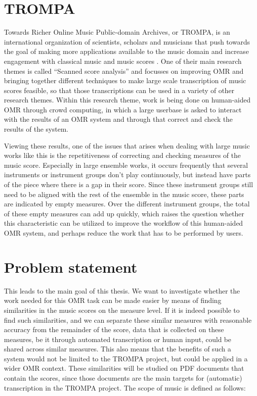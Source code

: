 \section{TROMPA}\label{sec:introduction-TROMPA}
Towards Richer Online Music Public-domain Archives, or TROMPA, is an international organization of scientists, scholars and musicians that push towards the goal of making more applications available to the music domain and increase engagement with classical music and music scores \citep{TROMPAwebpage}. One of their main research themes is called ``Scanned score analysis'' and focusses on improving OMR and bringing together different techniques to make large scale transcription of music scores feasible, so that those transcriptions can be used in a variety of other research themes. Within this research theme, work is being done on human-aided OMR through crowd computing, in which a large userbase is asked to interact with the results of an OMR system and through that correct and check the results of the system.


Viewing these results, one of the issues that arises when dealing with large music works like this is the repetitiveness of correcting and checking measures of the music score. Especially in large ensemble works, it occurs frequently that several instruments or instrument groups don't play continuously, but instead have parts of the piece where there is a gap in their score. Since these instrument groups still need to be aligned with the rest of the ensemble in the music score, these parts are indicated by empty measures. Over the different instrument groups, the total of these empty measures can add up quickly, which raises the question whether this characteristic can be utilized to improve the workflow of this human-aided OMR system, and perhaps reduce the work that has to be performed by users.

\section{Problem statement}\label{sec:introduction-problem-statement}
This leads to the main goal of this thesis. We want to investigate whether the work needed for this OMR task can be made easier by means of finding similarities in the music scores on the measure level. If it is indeed possible to find such similarities, and we can separate these similar measures with reasonable accuracy from the remainder of the score, data that is collected on these measures, be it through automated transcription or human input, could be shared across similar measures. This also means that the benefits of such a system would not be limited to the TROMPA project, but could be applied in a wider OMR context. These similarities will be studied on PDF documents that contain the scores, since those documents are the main targets for (automatic) transcription in the TROMPA project. The scope of music is defined as follows:

